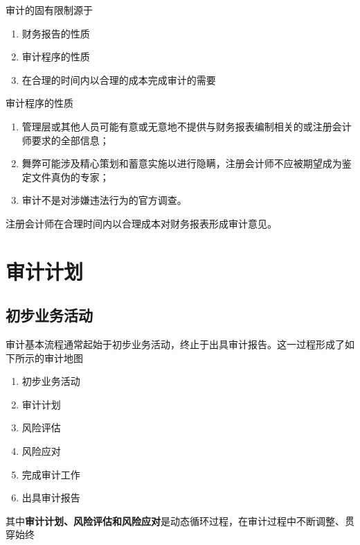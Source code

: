 \documentclass[UTF8,12pt]{ctexart}
\numberwithin{equation}{section} %
\numberwithin{figure}{section}
\numberwithin{table}{section}
\begin{document}
	审计的固有限制源于
	\begin{enumerate}
		\item 财务报告的性质
		
		\item 审计程序的性质
		
		\item 在合理的时间内以合理的成本完成审计的需要
	\end{enumerate}
	
	审计程序的性质
	\begin{enumerate}
		\item 管理层或其他人员可能有意或无意地不提供与财务报表编制相关的或注册会计师要求的全部信息；
		
		\item 舞弊可能涉及精心策划和蓄意实施以进行隐瞒，注册会计师不应被期望成为鉴定文件真伪的专家；
	
		\item 审计不是对涉嫌违法行为的官方调查。
	\end{enumerate}

	
	
	注册会计师在合理时间内以合理成本对财务报表形成审计意见。
	
	\newpage
	\section{审计计划}
	\subsection{初步业务活动}
	审计基本流程通常起始于初步业务活动，终止于出具审计报告。这一过程形成了如下所示的审计地图
	
	\begin{enumerate}
		\item 初步业务活动
		
		\item 审计计划
		
		\item 风险评估
		
		\item 风险应对
		
		\item 完成审计工作
		
		\item 出具审计报告
	\end{enumerate}
	
	其中\textbf{审计计划、风险评估和风险应对}是动态循环过程，在审计过程中不断调整、贯穿始终
	
\end{document}

